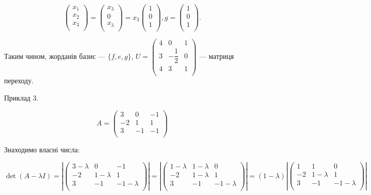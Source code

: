 $$\begin{pmatrix}
	x_1 \\
	x_2 \\
	x_3 \\
\end{pmatrix} = \begin{pmatrix}
	x_3 \\
	0 \\
	x_3 \\
\end{pmatrix} = x_3 \begin{pmatrix}
	1 \\
	0 \\
	1 \\
\end{pmatrix}, g = \begin{pmatrix}
	1 \\
	0 \\
	1 \\
\end{pmatrix}.$$

Таким чином, жорданів базис --- $\{f, e, g\}$, $U = \begin{pmatrix}
	4 & 0             & 1 \\
	3 & -\dfrac{1}{2} & 0 \\
	4 & 3             & 1 \\
\end{pmatrix} $ --- матриця переходу.

Приклад 3.

$$A = \begin{pmatrix}
	3  &  0 & -1 \\
	-2 &  1 &  1 \\
	3  & -1 & -1 \\
\end{pmatrix} $$

Знаходимо власні числа:

$$\det(A-\lambda I) = \left| \begin{pmatrix}
	3 - \lambda & 0           & -1 \\
	-2          & 1 - \lambda & 1 \\
	3           & -1          & -1 -\lambda \\
\end{pmatrix} \right| = \left| \begin{pmatrix}
	1 - \lambda & 1 - \lambda & 0 \\
	-2          & 1 - \lambda & 1 \\
	3           & -1          & -1 -\lambda \\
\end{pmatrix} \right| = (1 - \lambda) \left| \begin{pmatrix}
	1  & 1           & 0 \\
	-2 & 1 - \lambda & 1 \\
	3  & -1          & -1 -\lambda \\
\end{pmatrix} \right|$$


